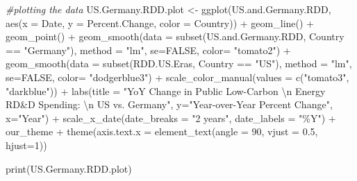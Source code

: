\documentclass[
  12pt,
]{article}
\newenvironment{Shaded}{\begin{snugshade}}{\end{snugshade}}
\newcommand{\AttributeTok}[1]{\textcolor[rgb]{0.77,0.63,0.00}{#1}}
\newcommand{\CommentTok}[1]{\textcolor[rgb]{0.56,0.35,0.01}{\textit{#1}}}
\newcommand{\ConstantTok}[1]{\textcolor[rgb]{0.00,0.00,0.00}{#1}}
\newcommand{\DecValTok}[1]{\textcolor[rgb]{0.00,0.00,0.81}{#1}}
\newcommand{\FloatTok}[1]{\textcolor[rgb]{0.00,0.00,0.81}{#1}}
\newcommand{\FunctionTok}[1]{\textcolor[rgb]{0.00,0.00,0.00}{#1}}
\newcommand{\NormalTok}[1]{#1}
\newcommand{\OtherTok}[1]{\textcolor[rgb]{0.56,0.35,0.01}{#1}}
\newcommand{\SpecialCharTok}[1]{\textcolor[rgb]{0.00,0.00,0.00}{#1}}
\newcommand{\StringTok}[1]{\textcolor[rgb]{0.31,0.60,0.02}{#1}}
\begin{document}
\begin{Shaded}
\begin{Highlighting}[]
\CommentTok{\#plotting the data}
\NormalTok{US.Germany.RDD.plot }\OtherTok{\textless{}{-}} \FunctionTok{ggplot}\NormalTok{(US.and.Germany.RDD,}
                              \FunctionTok{aes}\NormalTok{(}\AttributeTok{x =}\NormalTok{ Date,}
                                  \AttributeTok{y =}\NormalTok{ Percent.Change, }
                                  \AttributeTok{color =}\NormalTok{ Country)) }\SpecialCharTok{+} 
  \FunctionTok{geom\_line}\NormalTok{() }\SpecialCharTok{+}
  \FunctionTok{geom\_point}\NormalTok{() }\SpecialCharTok{+}
  \FunctionTok{geom\_smooth}\NormalTok{(}\AttributeTok{data =} \FunctionTok{subset}\NormalTok{(US.and.Germany.RDD, Country }\SpecialCharTok{==} \StringTok{"Germany"}\NormalTok{), }\AttributeTok{method =} \StringTok{"lm"}\NormalTok{, }\AttributeTok{se=}\ConstantTok{FALSE}\NormalTok{, }\AttributeTok{color=} \StringTok{"tomato2"}\NormalTok{) }\SpecialCharTok{+}
  \FunctionTok{geom\_smooth}\NormalTok{(}\AttributeTok{data =} \FunctionTok{subset}\NormalTok{(RDD.US.Eras, Country }\SpecialCharTok{==} \StringTok{"US"}\NormalTok{), }\AttributeTok{method =} \StringTok{"lm"}\NormalTok{, }\AttributeTok{se=}\ConstantTok{FALSE}\NormalTok{, }\AttributeTok{color=} \StringTok{"dodgerblue3"}\NormalTok{) }\SpecialCharTok{+}
  \FunctionTok{scale\_color\_manual}\NormalTok{(}\AttributeTok{values =} \FunctionTok{c}\NormalTok{(}\StringTok{"tomato3"}\NormalTok{, }\StringTok{"darkblue"}\NormalTok{)) }\SpecialCharTok{+}
  \FunctionTok{labs}\NormalTok{(}\AttributeTok{title =} \StringTok{"YoY Change in Public Low{-}Carbon }\SpecialCharTok{\textbackslash{}n}\StringTok{ Energy RD\&D Spending: }\SpecialCharTok{\textbackslash{}n}\StringTok{ US vs. Germany"}\NormalTok{,}
       \AttributeTok{y=}\StringTok{"Year{-}over{-}Year Percent Change"}\NormalTok{,}
       \AttributeTok{x=}\StringTok{"Year"}\NormalTok{) }\SpecialCharTok{+} 
  \FunctionTok{scale\_x\_date}\NormalTok{(}\AttributeTok{date\_breaks =} \StringTok{"2 years"}\NormalTok{, }\AttributeTok{date\_labels =} \StringTok{"\%Y"}\NormalTok{) }\SpecialCharTok{+}
\NormalTok{  our\_theme }\SpecialCharTok{+}
  \FunctionTok{theme}\NormalTok{(}\AttributeTok{axis.text.x =} \FunctionTok{element\_text}\NormalTok{(}\AttributeTok{angle =} \DecValTok{90}\NormalTok{, }\AttributeTok{vjust =} \FloatTok{0.5}\NormalTok{, }\AttributeTok{hjust=}\DecValTok{1}\NormalTok{))}
  
\FunctionTok{print}\NormalTok{(US.Germany.RDD.plot)}
\end{Highlighting}
\end{Shaded}
\end{document}

